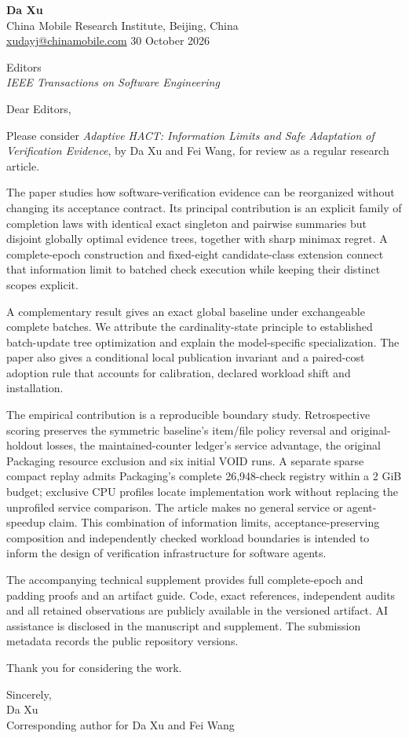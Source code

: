 \documentclass[11pt,letterpaper]{article}
\begin{document}
\textbf{Da Xu}\\
China Mobile Research Institute, Beijing, China\\
\href{mailto:xudayj@chinamobile.com}{xudayj@chinamobile.com}
\hfill 30 October 2026

Editors\\
\emph{IEEE Transactions on Software Engineering}

Dear Editors,

Please consider \emph{Adaptive HACT: Information Limits and Safe Adaptation
of Verification Evidence}, by Da Xu and Fei Wang, for review as a regular
research article.

The paper studies how software-verification evidence can be reorganized
without changing its acceptance contract. Its principal contribution is an
explicit family of completion laws with identical exact singleton and
pairwise summaries but disjoint globally optimal evidence trees, together
with sharp minimax regret. A complete-epoch construction and fixed-eight
candidate-class extension connect that information limit to batched check
execution while keeping their distinct scopes explicit.

A complementary result gives an exact global baseline under exchangeable
complete batches. We attribute the cardinality-state principle to established
batch-update tree optimization and explain the model-specific specialization.
The paper also gives a conditional local publication invariant and a
paired-cost adoption rule that accounts for calibration, declared workload
shift and installation.

The empirical contribution is a reproducible boundary study. Retrospective
scoring preserves the symmetric baseline's item/file policy reversal and
original-holdout losses, the maintained-counter ledger's service advantage,
the original Packaging resource exclusion and six initial VOID runs.
A separate sparse compact replay admits Packaging's complete 26,948-check
registry within a 2 GiB budget; exclusive CPU profiles locate implementation
work without replacing the unprofiled service comparison. The article makes
no general service or agent-speedup claim. This combination of information
limits, acceptance-preserving composition and independently checked workload
boundaries is intended to inform the design of verification infrastructure
for software agents.

The accompanying technical supplement provides full complete-epoch and
padding proofs and an artifact guide. Code, exact references, independent
audits and all retained observations are publicly available in the
versioned artifact. AI assistance is disclosed in the manuscript and
supplement. The submission metadata records the public repository versions.

Thank you for considering the work.

Sincerely,\\
Da Xu\\
Corresponding author for Da Xu and Fei Wang
\end{document}
